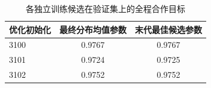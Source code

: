 \begin{table}[!htbp]
\centering
\caption{各独立训练候选在验证集上的全程合作目标}
\label{tab:w2-training-validation-semantic}
\begin{tabular}{lcc}
\toprule
优化初始化 & 最终分布均值参数 & 末代最佳候选参数 \\
\midrule
3100 & 0.9767 & 0.9767 \\
3101 & 0.9724 & 0.9725 \\
3102 & 0.9752 & 0.9752 \\
\bottomrule
\end{tabular}
\par{}
\end{table}
